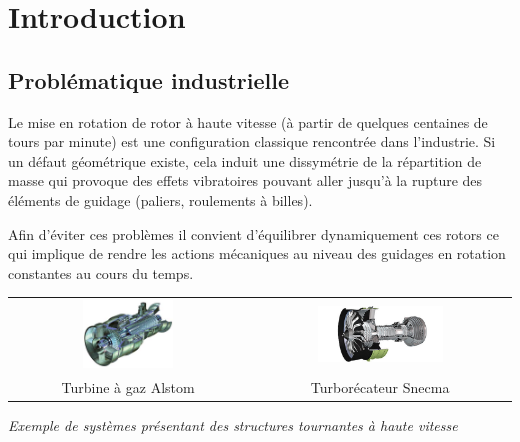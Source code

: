 \documentclass[10pt,fleqn]{article} %
\begin{document}

\setlength{\columnseprule}{.1pt}

\vspace{2cm}
\pagestyle{fancy}
\thispagestyle{plain}




\section{Introduction}
\subsection{Problématique industrielle}

Le mise en rotation de rotor à haute vitesse (à partir de quelques centaines de tours par minute) est une configuration classique rencontrée dans l'industrie. Si un défaut géométrique existe, cela induit une dissymétrie de la répartition de masse qui provoque des effets vibratoires pouvant aller jusqu'à la rupture des éléments de guidage (paliers, roulements à billes).

Afin d'éviter ces problèmes il convient d'équilibrer dynamiquement ces rotors ce qui implique de rendre les actions mécaniques au niveau des guidages en rotation constantes au cours du temps.

\begin{center}
\begin{tabular}{cc}
\includegraphics[width=0.4\textwidth]{images/turbine_alstom.jpeg}
&
\includegraphics[width=0.5\textwidth]{images/turboreacteur.jpeg}\\
Turbine à gaz Alstom & Turborécateur Snecma
\end{tabular}
\textit{Exemple de systèmes présentant des structures tournantes à haute vitesse \label{exemple_rotor}}
\end{center}
\end{document}
